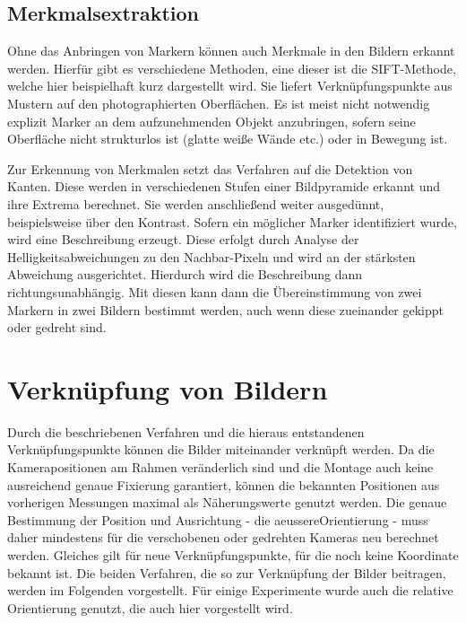 \documentclass[./00PhotoBox.tex]{subfiles}
\begin{document}
\subsection{Merkmalsextraktion}
\label{ss:sift}
Ohne das Anbringen von Markern können auch Merkmale in den Bildern erkannt werden. Hierfür gibt es verschiedene Methoden, eine dieser ist die SIFT-Methode, welche hier beispielhaft kurz dargestellt wird. Sie liefert Verknüpfungspunkte aus Mustern auf den photographierten Oberflächen. Es ist meist nicht notwendig explizit Marker an dem aufzunehmenden Objekt anzubringen, sofern seine Oberfläche nicht strukturlos ist (glatte weiße Wände etc.) oder in Bewegung ist.

Zur Erkennung von Merkmalen setzt das Verfahren auf die Detektion von Kanten. Diese werden in verschiedenen Stufen einer Bildpyramide erkannt und ihre Extrema berechnet. Sie werden anschließend weiter ausgedünnt, beispielsweise über den Kontrast. Sofern ein möglicher Marker identifiziert wurde, wird eine Beschreibung erzeugt. Diese erfolgt  durch Analyse der Helligkeitsabweichungen zu den Nachbar-Pixeln und wird an der stärksten Abweichung ausgerichtet. Hierdurch wird die Beschreibung dann richtungsunabhängig. Mit diesen kann dann die Übereinstimmung von zwei Markern in zwei Bildern bestimmt werden, auch wenn diese zueinander gekippt oder gedreht sind.
\citep[S. 484f]{luhmann}

\section{Verknüpfung von Bildern}
\label{s:photogramm}
Durch die beschriebenen Verfahren und die hieraus entstandenen Verknüpfungs\-punkte können die Bilder miteinander verknüpft werden. Da die Kamerapositionen am Rahmen veränderlich sind und die Montage auch keine ausreichend genaue Fixierung garantiert, können die bekannten Positionen aus vorherigen Messungen maximal als Näherungswerte genutzt werden. Die genaue Bestimmung der Position und Ausrichtung - die \gls{aeussereOrientierung} - muss daher mindestens für die verschobenen oder gedrehten Kameras neu berechnet werden. Gleiches gilt für neue Verknüpfungspunkte, für die noch keine Koordinate bekannt ist. Die beiden Verfahren, die so zur Verknüpfung der Bilder beitragen, werden im Folgenden vorgestellt. Für einige Experimente wurde auch die relative Orientierung genutzt, die auch hier vorgestellt wird.
\end{document}
